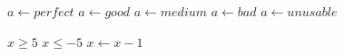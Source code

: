 \documentclass{article}
\begin{document}
\begin{algorithmic}[1]
 \State $a\gets perfect$
 \State $a\gets good$
 \State $a\gets medium$
             \State $a\gets bad$
  \Else
                 \State $a\gets unusable$
  \EndIf
\end{algorithmic}

\begin{algorithmic}[1]
            \Require $x\ge5$
\Ensure $x\le-5$
             \Statex
{}
                  \State $x\gets x-1$
                                \EndWhile
\end{algorithmic}
\end{document}
